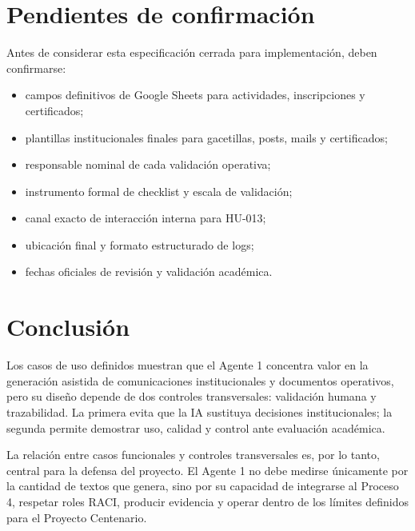 \documentclass[11pt,a4paper]{article}
\begin{document}
\section{Pendientes de confirmación}

Antes de considerar esta especificación cerrada para implementación, deben confirmarse:

\begin{itemize}
  \item campos definitivos de Google Sheets para actividades, inscripciones y certificados;
  \item plantillas institucionales finales para gacetillas, posts, mails y certificados;
  \item responsable nominal de cada validación operativa;
  \item instrumento formal de checklist y escala de validación;
  \item canal exacto de interacción interna para HU-013;
  \item ubicación final y formato estructurado de logs;
  \item fechas oficiales de revisión y validación académica.
\end{itemize}

\section{Conclusión}

Los casos de uso definidos muestran que el Agente 1 concentra valor en la generación asistida de comunicaciones institucionales y documentos operativos, pero su diseño depende de dos controles transversales: validación humana y trazabilidad. La primera evita que la IA sustituya decisiones institucionales; la segunda permite demostrar uso, calidad y control ante evaluación académica.

La relación entre casos funcionales y controles transversales es, por lo tanto, central para la defensa del proyecto. El Agente 1 no debe medirse únicamente por la cantidad de textos que genera, sino por su capacidad de integrarse al Proceso 4, respetar roles RACI, producir evidencia y operar dentro de los límites definidos para el Proyecto Centenario.
\end{document}

